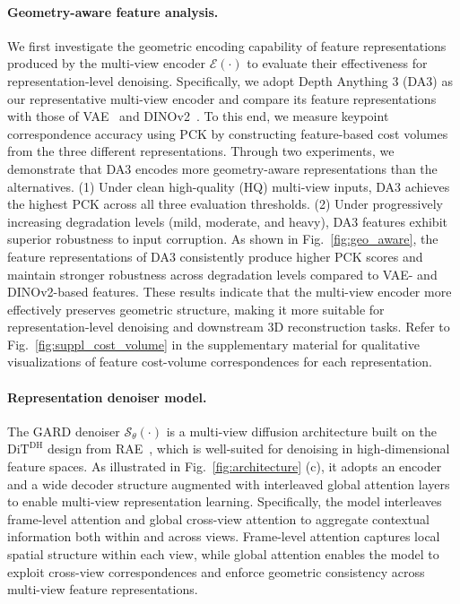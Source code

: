 \documentclass{llmxive}
\begin{document}
\paragraph{Geometry-aware feature analysis.}
We first investigate the geometric encoding capability of feature representations produced by the multi-view encoder $\mathcal{E}(\cdot)$ to evaluate their effectiveness for representation-level denoising. Specifically, we adopt Depth Anything 3 (DA3) as our representative multi-view encoder and compare its feature representations with those of VAE~\cite{kingma2013auto} and DINOv2~\cite{oquab2023dinov2}. To this end, we measure keypoint correspondence accuracy using PCK by constructing feature-based cost volumes from the three different representations. Through two experiments, we demonstrate that DA3 encodes more geometry-aware representations than the alternatives. (1) Under clean high-quality (HQ) multi-view inputs, DA3 achieves the highest PCK across all three evaluation thresholds. (2) Under progressively increasing degradation levels (mild, moderate, and heavy), DA3 features exhibit superior robustness to input corruption. As shown in Fig.~\ref{fig:geo_aware}, the feature representations of DA3 consistently produce higher PCK scores and maintain stronger robustness across degradation levels compared to VAE- and DINOv2-based features. These results indicate that the multi-view encoder more effectively preserves geometric structure, making it more suitable for representation-level denoising and downstream 3D reconstruction tasks. Refer to Fig.~\ref{fig:suppl_cost_volume} in the supplementary material for qualitative visualizations of feature cost-volume correspondences for each representation.




\paragraph{Representation denoiser model.}
The GARD denoiser $\mathcal{S}_{\theta}(\cdot)$ is a multi-view diffusion architecture built on the $\text{DiT}^{\text{DH}}$ design from RAE~\cite{zheng2025diffusion}, which is well-suited for denoising in high-dimensional feature spaces. As illustrated in Fig.~\ref{fig:architecture} (c), it adopts an encoder and a wide decoder structure augmented with interleaved global attention layers to enable multi-view representation learning. Specifically, the model interleaves frame-level attention and global cross-view attention to aggregate contextual information both within and across views. Frame-level attention captures local spatial structure within each view, while global attention enables the model to exploit cross-view correspondences and enforce geometric consistency across multi-view feature representations.
\end{document}

